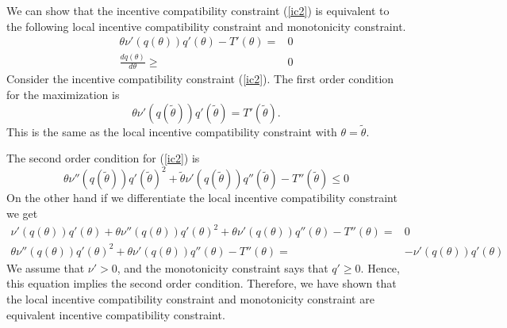 We can show that the incentive compatibility constraint (\ref{ic2}) is
equivalent to the following local incentive 
compatibility constraint and monotonicity constraint.
\begin{align}
  \theta \nu'(q(\theta))q'(\theta) - T'(\theta) = & 0 \label{lic} \\
  \frac{dq(\theta)}{d\theta} \geq & 0 \label{mon}
\end{align}
Consider the incentive compatibility constraint
(\ref{ic2}). The first order condition for the maximization is
\[ \theta \nu'(q(\tilde{\theta})) q'(\tilde{\theta}) =
T'(\tilde{\theta}). \]
This is the same as the local incentive compatibility constraint with
$\theta = \tilde{\theta}$.

The second order condition for (\ref{ic2}) is 
\[ \theta \nu''(q(\tilde{\theta}))q'(\tilde{\theta})^2 +
\tilde{\theta} \nu'(q(\tilde{\theta})) q''(\tilde{\theta}) -
T''(\tilde{\theta}) \leq 0 \]   
On the other hand if we differentiate the local incentive
compatibility constraint we get 
\begin{align*}
  \nu'(q(\theta))q'(\theta) + \theta \nu''(q(\theta)) q'(\theta)^2 + \theta
  \nu'(q(\theta)) q''(\theta) - T''(\theta) = & 0 \\
  \theta \nu''(q(\theta)) q'(\theta)^2 + \theta
  \nu'(q(\theta)) q''(\theta) - T''(\theta) = & -\nu'(q(\theta))q'(\theta)  
\end{align*}
We assume that $\nu'>0$, and the monotonicity constraint says that
$q'\geq 0$. Hence, this equation implies the second order
condition. Therefore, we have shown that the local incentive
compatibility constraint and monotonicity constraint are equivalent
incentive compatibility constraint.

